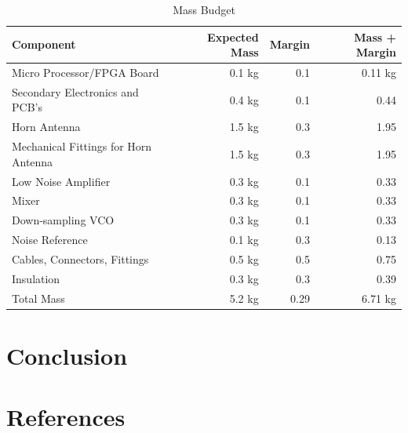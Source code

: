 \documentclass[12pt]{article}
\begin{document}
\begin{table}[!h]
	\centering
	\vspace{0.5cm}
	\renewcommand{\arraystretch}{1.3}
	\caption{Mass Budget }
	\label{tab:massBudget}
	\begin{tabularx}{\textwidth}{lrrr}
		\toprule
		Component & Expected Mass & Margin & Mass + Margin \\		
		\midrule
		Micro Processor/FPGA Board			&0.1 kg & 0.1& 0.11 kg \\ 
		Secondary Electronics and PCB's		&0.4 kg & 0.1& 0.44 \\
		Horn Antenna						&1.5 kg & 0.3& 1.95 \\ 
		Mechanical Fittings for Horn Antenna&1.5 kg & 0.3& 1.95 \\ 				
		Low Noise Amplifier					&0.3 kg & 0.1& 0.33 \\ 
		Mixer						 		&0.3 kg & 0.1& 0.33 \\ 
		Down-sampling VCO			 		&0.3 kg & 0.1& 0.33 \\ 
		Noise Reference						&0.1 kg & 0.3& 0.13 \\
		Cables, Connectors, Fittings		&0.5 kg & 0.5& 0.75 \\
		Insulation							&0.3 kg & 0.3& 0.39 \\ 		\midrule
		Total Mass							&5.2 kg & 0.29& 6.71 kg
	\end{tabularx}	
\end{table}

\section{Conclusion}

\newpage
\section{References}


\end{document}
